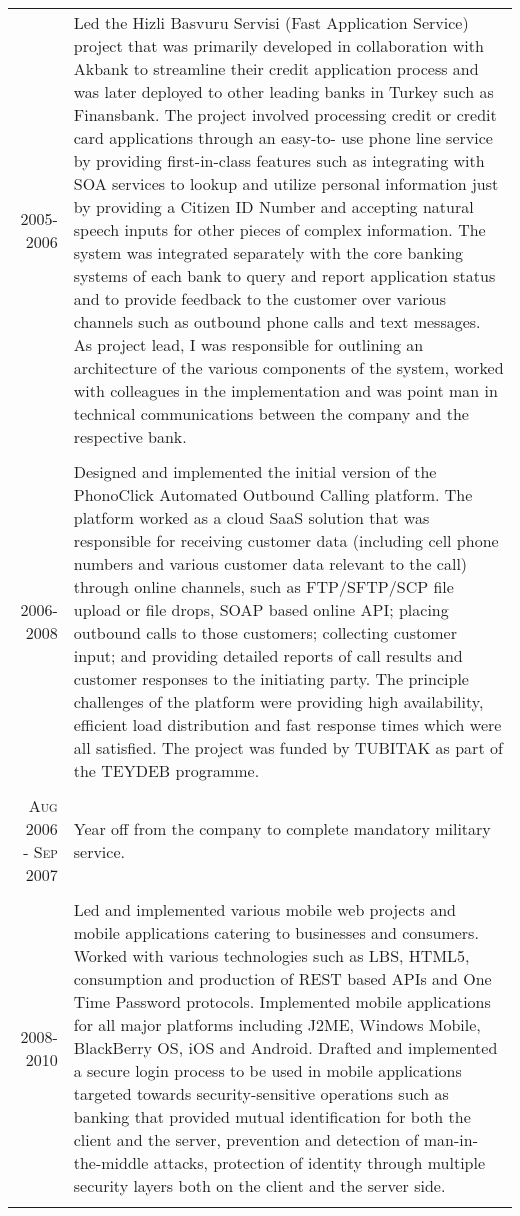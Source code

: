 \documentclass[a4paper,10pt]{article}
\begin{document}
\begin{longtable}{r|p{11cm}}
  \textsc{2005-2006}            & Led the Hizli Basvuru Servisi (Fast Application Service) project that was primarily developed in collaboration with Akbank to streamline their credit application process and was later deployed to other leading banks in Turkey such as Finansbank. The project involved processing credit or credit card applications through an easy-to- use phone line service by providing first-in-class features such as integrating with SOA services to lookup and utilize personal information just by providing a Citizen ID Number and accepting natural speech inputs for other pieces of complex information. The system was integrated separately with the core banking systems of each bank to query and report application status and to provide feedback to the customer over various channels such as outbound phone calls and text messages. As project lead, I was responsible for outlining an architecture of the various components of the system, worked with colleagues in the implementation and was point man in technical communications between the company and the respective bank. \\
  \multicolumn{2}{c}{} \\


  \textsc{2006-2008}            & Designed and implemented the initial version of the PhonoClick Automated Outbound Calling platform. The platform worked as a cloud SaaS solution that was responsible for receiving customer data (including cell phone numbers and various customer data relevant to the call) through online channels, such as FTP/SFTP/SCP file upload or file drops, SOAP based online API; placing outbound calls to those customers; collecting customer input; and providing detailed reports of call results and customer responses to the initiating party. The principle challenges of the platform were providing high availability, efficient load distribution and fast response times which were all satisfied. The project was funded by TUBITAK as part of the TEYDEB programme. \\
  \multicolumn{2}{c}{} \\


  \textsc{Aug 2006 - Sep 2007}  & Year off from the company to complete mandatory military service. \\
  \multicolumn{2}{c}{} \\


  \textsc{2008-2010}            & Led and implemented various mobile web projects and mobile applications catering to businesses and consumers. Worked with various technologies such as LBS, HTML5, consumption and production of REST based APIs and One Time Password protocols. Implemented mobile applications for all major platforms including J2ME, Windows Mobile, BlackBerry OS, iOS and Android. Drafted and implemented a secure login process to be used in mobile applications targeted towards security-sensitive operations such as banking that provided mutual identification for both the client and the server, prevention and detection of man-in-the-middle attacks, protection of identity through multiple security layers both on the client and the server side. \\
  \multicolumn{2}{c}{} \\



\end{longtable}
\end{document}
